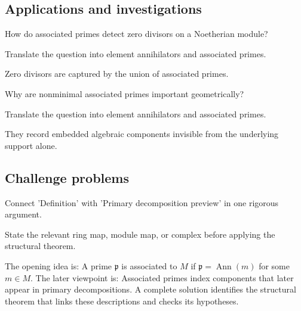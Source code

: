 \subsection*{Applications and investigations}

\begin{exercise}\label{exr:v17-expand-13}
How do associated primes detect zero divisors on a Noetherian module?
\end{exercise}
\begin{hint}
Translate the question into element annihilators and associated primes.
\end{hint}
\begin{solution}
Zero divisors are captured by the union of associated primes.
\end{solution}

\begin{exercise}\label{exr:v17-expand-14}
Why are nonminimal associated primes important geometrically?
\end{exercise}
\begin{hint}
Translate the question into element annihilators and associated primes.
\end{hint}
\begin{solution}
They record embedded algebraic components invisible from the underlying support alone.
\end{solution}

\subsection*{Challenge problems}

\begin{exercise}\label{exr:v17-expand-15}
Connect 'Definition' with 'Primary decomposition preview' in one rigorous argument.
\end{exercise}
\begin{hint}
State the relevant ring map, module map, or complex before applying the structural theorem.
\end{hint}
\begin{solution}
The opening idea is: A prime $\mathfrak p$ is associated to $M$ if $\mathfrak p=\operatorname{Ann}(m)$ for some $m\in M$. The later viewpoint is: Associated primes index components that later appear in primary decompositions. A complete solution identifies the structural theorem that links these descriptions and checks its hypotheses.
\end{solution}

